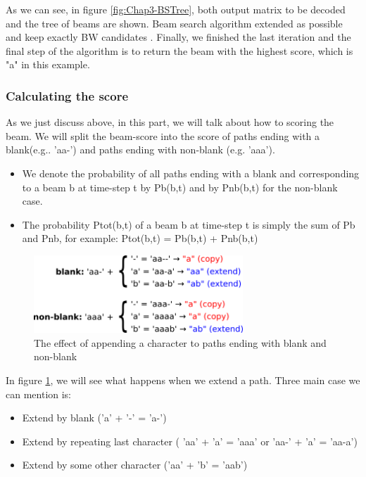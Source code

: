       As we can see, in figure \ref{fig:Chap3-BSTree}, both output matrix to be decoded and the tree of beams are shown. 
      Beam search algorithm extended as possible and keep exactly BW candidates . Finally,
      we finished the last iteration and the final step of the algorithm is to return the beam 
      with the highest score, which is "a" in this example.
      
      \subsubsection{ Calculating the score }
      As we just discuss above, in this part, we will talk about how to scoring the beam.
      We will split the beam-score into the score of paths ending with a blank(e.g.. 'aa-')
      and paths ending with non-blank (e.g. 'aaa'). 
      \begin{itemize}
        \item We denote the probability of all paths ending with a blank and corresponding to a beam b at time-step t 
        by Pb(b,t) and by Pnb(b,t) for the non-blank case.
        \item The probability Ptot(b,t) of a beam b at time-step t is simply the sum of Pb and Pnb, for example:
        Ptot(b,t) = Pb(b,t) + Pnb(b,t)
      \end{itemize}

      \begin{figure}[H]
        \centering
        \includegraphics[width=0.7\textwidth]{img/Chap3/CTC_Scoring}
        \caption{ The effect of appending a character to paths ending with blank and non-blank }
        \label{fig:Chap3-CTC_Scoring}
      \end{figure}

      In figure \ref{fig:Chap3-CTC_Scoring}, we will see what happens when we extend a path. Three main case we can mention
      is:
      \begin{itemize}
        \item Extend by blank ('a' + '-' = 'a-')
        \item Extend by repeating last character ( 'aa' + 'a' = 'aaa' or 'aa-' + 'a' = 'aa-a')
        \item Extend by some other character ('aa' + 'b' = 'aab')
      \end{itemize}

